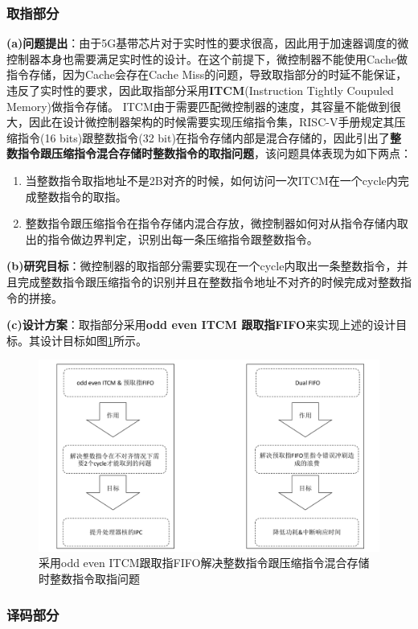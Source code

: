 \documentclass[a4paper, 12pt]{article}
\begin{document}
\subsubsection{取指部分}
\textbf{(a)问题提出}：由于5G基带芯片对于实时性的要求很高，因此用于加速器调度的微控制器本身也需要满足实时性的设计。在这个前提下，微控制器不能使用Cache做指令存储，因为Cache会存在Cache Miss的问题，导致取指部分的时延不能保证，违反了实时性的要求，因此取指部分采用\textbf{ITCM}(Instruction Tightly Coupuled Memory)做指令存储。
ITCM由于需要匹配微控制器的速度，其容量不能做到很大，因此在设计微控制器架构的时候需要实现压缩指令集，RISC-V手册规定其压缩指令(16 bits)跟整数指令(32 bit)在指令存储内部是混合存储的，因此引出了\textbf{整数指令跟压缩指令混合存储时整数指令的取指问题}，该问题具体表现为如下两点：
\begin{enumerate}
  \item 当整数指令取指地址不是2B对齐的时候，如何访问一次ITCM在一个cycle内完成整数指令的取指。
  \item 整数指令跟压缩指令在指令存储内混合存放，微控制器如何对从指令存储内取出的指令做边界判定，识别出每一条压缩指令跟整数指令。
\end{enumerate}

\textbf{(b)研究目标}：微控制器的取指部分需要实现在一个cycle内取出一条整数指令，并且完成整数指令跟压缩指令的识别并且在整数指令地址不对齐的时候完成对整数指令的拼接。

\textbf{(c)设计方案}：取指部分采用\textbf{odd even ITCM 跟取指FIFO}来实现上述的设计目标。其设计目标如图\ref{fig:if_design_features}所示。
\begin{figure}
  \centering
  \includegraphics[width=0.8\linewidth]{./images/if_design_features.pdf}
  \caption{采用odd even ITCM跟取指FIFO解决整数指令跟压缩指令混合存储时整数指令取指问题}
  \label{fig:if_design_features}
\end{figure}
\subsubsection{译码部分}
  
\end{document}
